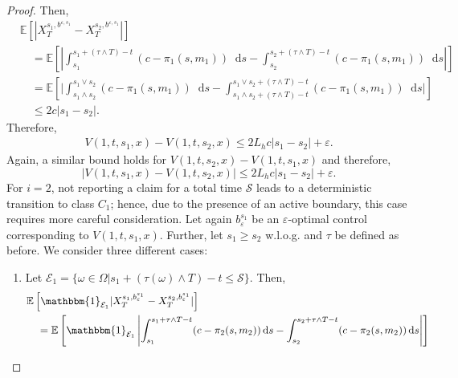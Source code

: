 \documentclass[a4paper]{scrartcl}
\theoremstyle{remark}
\theoremstyle{definition}
\numberwithin{equation}{section}
\newcommand*\diff{\mathop{}\!\mathrm{d}}
\newcommand{\ind}{\mathbbm{1}_}
\begin{document}
\begin{proof}
    Then,
    \begin{align}
     \label{eq:continuity_in_s}
        &\mathbb{E}\left[|X_T^{s_1,b^{\varepsilon, s_1}} - X_T^{s_2,b^{\varepsilon, s_1}}| \right] \nonumber\\
        &\quad= \mathbb{E}\left[\left| \int_{s_1}^{s_1+(\tau \wedge T)-t} (c-\pi_1(s,m_1))\diff s - \int_{s_2}^{s_2+(\tau \wedge T)-t} (c-\pi_1(s,m_1))\diff s\right|\right] \nonumber\\
        &\quad =  \mathbb{E}\left[\biggl|\int_{s_1 \wedge s_2}^{s_1 \vee s_2} (c-\pi_1(s,m_1)) \diff s - \int_{s_1\wedge s_2+(\tau \wedge T)-t}^{s_1 \vee s_2+(\tau \wedge T)-t} (c-\pi_1(s,m_1)) \diff s \biggr|\right] \nonumber \\
        &\quad \leq 2c|s_1-s_2|.
    \end{align}
    Therefore,
    \begin{align*}
        V(1,t,s_1,x)-V(1,t,s_2,x) \leq 2 L_h c |s_1-s_2|+\varepsilon.
    \end{align*}
    Again, a similar bound holds for $V(1,t,s_2,x)-V(1,t,s_1,x)$ and therefore,
    \begin{equation*}
        |V(1,t,s_1,x)-V(1,t,s_2,x)| \leq 2 L_h c  |s_1-s_2|+\varepsilon.
    \end{equation*}
    For $i=2$, not reporting a claim for a total time $\mathcal{S}$ leads to a deterministic transition to class $C_1$; hence, due to the presence of an active boundary, this case requires more careful consideration.
    Let again $b_\varepsilon^{s_1}$ be an $\varepsilon$-optimal control corresponding to $V(1,t,s_1,x)$. Further, let $s_1 \geq s_2$ w.l.o.g. and $\tau$ be defined as before. We consider three different cases:
    \begin{enumerate}
        \item %
        Let $\mathcal{E}_1=\{\omega \in \Omega|s_1 + (\tau(\omega) \wedge T)-t \leq \mathcal{S}\}$.
        Then,
        \begin{align*}
            &\mathbb{E}\left[\ind{\mathcal{E}_1}|X_T^{s_1,b_\varepsilon^{s_1}} - X_T^{s_2,b_\varepsilon^{s_1}}| \right] \\
            & \quad = \mathbb{E}\left[\ind{\mathcal{E}_1}\left|\int_{s_1}^{s_1 + \tau\wedge T - t}(c- \pi_2(s,m_2))\diff s - \int_{s_2}^{s_2 + \tau\wedge T - t}(c- \pi_2(s,m_2))\diff s\right|\right]\\

\end{align*}
\end{enumerate}
\end{proof}
\end{document}
